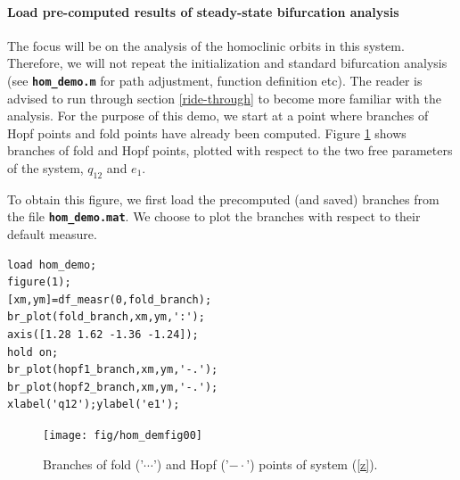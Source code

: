 \documentclass[10pt]{scrartcl}
\newcommand{\file}[1]{\textbf{\texttt{#1}}}
\begin{document}
\paragraph{Load pre-computed results of steady-state bifurcation analysis}
The focus will be on the analysis of the homoclinic orbits in this
system.  Therefore, we will not repeat the initialization and standard
bifurcation analysis (see \file{hom\_demo.m} for path adjustment,
function definition etc).  The reader is advised to run through
section \ref{ride-through} to become more familiar with the analysis.
For the purpose of this demo, we start at a point where branches of
Hopf points and fold points have already been computed. Figure
\ref{demo3-1} shows branches of fold and Hopf points, plotted with
respect to the two free parameters of the system, $q_{12}$ and $e_1$.

To obtain this figure, we first load the precomputed (and saved)
branches from the file \file{hom\_demo.mat}.  We choose to plot the
branches with respect to their default measure.
\begin{lstlisting}
load hom_demo;
figure(1);
[xm,ym]=df_measr(0,fold_branch);
br_plot(fold_branch,xm,ym,':');
axis([1.28 1.62 -1.36 -1.24]);
hold on;
br_plot(hopf1_branch,xm,ym,'-.');
br_plot(hopf2_branch,xm,ym,'-.');
xlabel('q12');ylabel('e1');  
\end{lstlisting}
\begin{figure}[ht]
\begin{center}
\texttt{[image: fig/hom\_demfig00]}
\caption{\label{demo3-1}Branches of fold ('$\cdots$') and Hopf
  ('$-\cdot$') points of system (\ref{z}).}
\end{center}
\end{figure}
\end{document}
